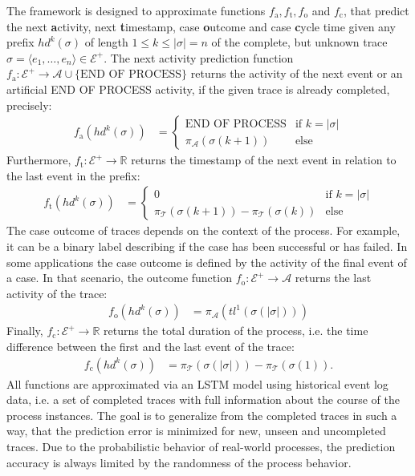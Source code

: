 The framework is designed to approximate functions $f_\mathrm{a}, f_\mathrm{t}, f_\mathrm{o}$ and $f_\mathrm{c}$, that predict the next \textbf{a}ctivity, next \textbf{t}imestamp, case \textbf{o}utcome and case \textbf{c}ycle time given any prefix $hd^k(\sigma)$ of length $1 \leq k \leq |\sigma| = n$ of the complete, but unknown trace $\sigma = \langle e_1, \dots, e_{n} \rangle \in \mathcal{E}^+$.
The next activity prediction function $f_\mathrm{a}\colon \mathcal{E}^+ \to \mathcal{A} \cup \{\text{END OF PROCESS}\}$ returns the activity of the next event or an artificial END OF PROCESS activity, if the given trace is already completed, precisely:
\begin{align*}
f_\mathrm{a}(hd^k(\sigma)) &= 
\begin{cases}
	\text{END OF PROCESS}& \text{if $k = |\sigma|$} \\
	\pi_\mathcal{A}(\sigma(k+1)) & \text{else} 
\end{cases}
\end{align*}
Furthermore, $f_\mathrm{t} \colon \mathcal{E}^+ \to \mathbb{R}$ returns the timestamp of the next event in relation to the last event in the prefix:
\begin{align*}
f_\mathrm{t}(hd^k(\sigma)) &=
\begin{cases}
0 & \text{if $k = |\sigma|$} \\
\pi_\mathcal{T}(\sigma(k+1)) - \pi_\mathcal{T}(\sigma(k)) & \text{else} 
\end{cases}
\end{align*}
The case outcome of traces depends on the context of the process.
For example, it can be a binary label describing if the case has been successful or has failed.
In some applications the case outcome is defined by the activity of the final event of a case.
In that scenario, the outcome function $f_\mathrm{o} \colon \mathcal{E}^+ \to \mathcal{A}$ returns the last activity of the trace:
\begin{align*}
f_\mathrm{o}(hd^k(\sigma)) &= \pi_\mathcal{A}(tl^1(\sigma(|\sigma|)))
\end{align*}
Finally, $f_\mathrm{c} \colon \mathcal{E}^+ \to \mathbb{R}$ returns the total duration of the process, i.e. the time difference between the first and the last event of the trace:
\begin{align*}
f_\mathrm{c}(hd^k(\sigma)) &=  \pi_\mathcal{T}(\sigma(|\sigma|))-  \pi_\mathcal{T}(\sigma(1)).
\end{align*}
All functions are approximated via an LSTM model using historical event log data, i.e. a set of completed traces with full information about the course of the process instances.
The goal is to generalize from the completed traces in such a way, that the prediction error is minimized for new, unseen and uncompleted traces.
Due to the probabilistic behavior of real-world processes, the prediction accuracy is always limited by the randomness of the process behavior.

